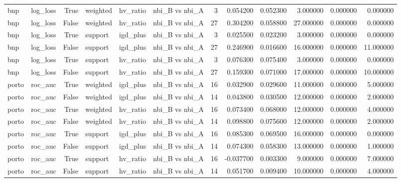 \begin{longtable}{llrlllrrrrrr}
bnp & log\_loss & True & weighted & hv\_ratio & nbi\_B vs nbi\_A & 3 & 0.054200 & 0.052300 & 3.000000 & 0.000000 & 0.000000 \\
bnp & log\_loss & False & weighted & hv\_ratio & nbi\_B vs nbi\_A & 27 & 0.304200 & 0.058800 & 27.000000 & 0.000000 & 0.000000 \\
bnp & log\_loss & True & support & igd\_plus & nbi\_B vs nbi\_A & 3 & 0.025500 & 0.023200 & 3.000000 & 0.000000 & 0.000000 \\
bnp & log\_loss & False & support & igd\_plus & nbi\_B vs nbi\_A & 27 & 0.246900 & 0.016600 & 16.000000 & 0.000000 & 11.000000 \\
bnp & log\_loss & True & support & hv\_ratio & nbi\_B vs nbi\_A & 3 & 0.076300 & 0.075400 & 3.000000 & 0.000000 & 0.000000 \\
bnp & log\_loss & False & support & hv\_ratio & nbi\_B vs nbi\_A & 27 & 0.159300 & 0.071000 & 17.000000 & 0.000000 & 10.000000 \\
porto & roc\_auc & True & weighted & igd\_plus & nbi\_B vs nbi\_A & 16 & 0.032900 & 0.029600 & 11.000000 & 0.000000 & 5.000000 \\
porto & roc\_auc & False & weighted & igd\_plus & nbi\_B vs nbi\_A & 14 & 0.043800 & 0.030500 & 12.000000 & 0.000000 & 2.000000 \\
porto & roc\_auc & True & weighted & hv\_ratio & nbi\_B vs nbi\_A & 16 & 0.073400 & 0.068000 & 12.000000 & 0.000000 & 4.000000 \\
porto & roc\_auc & False & weighted & hv\_ratio & nbi\_B vs nbi\_A & 14 & 0.098800 & 0.075600 & 12.000000 & 0.000000 & 2.000000 \\
porto & roc\_auc & True & support & igd\_plus & nbi\_B vs nbi\_A & 16 & 0.085300 & 0.069500 & 16.000000 & 0.000000 & 0.000000 \\
porto & roc\_auc & False & support & igd\_plus & nbi\_B vs nbi\_A & 14 & 0.074300 & 0.058300 & 13.000000 & 0.000000 & 1.000000 \\
porto & roc\_auc & True & support & hv\_ratio & nbi\_B vs nbi\_A & 16 & -0.037700 & 0.003300 & 9.000000 & 0.000000 & 7.000000 \\
porto & roc\_auc & False & support & hv\_ratio & nbi\_B vs nbi\_A & 14 & 0.051700 & 0.009400 & 10.000000 & 0.000000 & 4.000000 \\
\end{longtable}\endgroup
